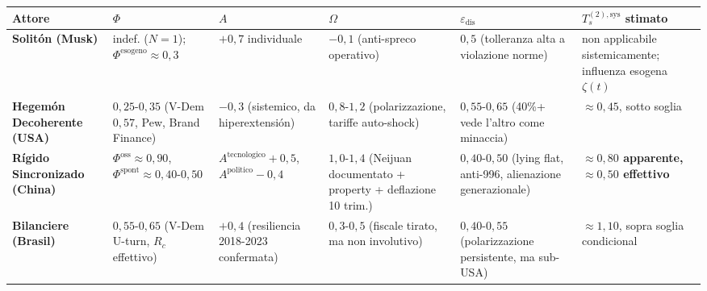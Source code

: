 {\def\LTcaptype{none} %
{\small\begin{longtable}[]{@{}
  >{\raggedright\arraybackslash}p{}
  >{\raggedright\arraybackslash}p{}
  >{\raggedright\arraybackslash}p{}
  >{\raggedright\arraybackslash}p{}
  >{\raggedright\arraybackslash}p{}
  >{\raggedright\arraybackslash}p{}@{}}
\toprule\noalign{}
\begin{minipage}[b]{\linewidth}\raggedright
Attore
\end{minipage} & \begin{minipage}[b]{\linewidth}\raggedright
\(\Phi\)
\end{minipage} & \begin{minipage}[b]{\linewidth}\raggedright
\(A\)
\end{minipage} & \begin{minipage}[b]{\linewidth}\raggedright
\(\Omega\)
\end{minipage} & \begin{minipage}[b]{\linewidth}\raggedright
\(\varepsilon_{\text{dis}}\)
\end{minipage} & \begin{minipage}[b]{\linewidth}\raggedright
\(T_s^{(2),\text{sys}}\) stimato
\end{minipage} \\
\midrule\noalign{}
\endhead
\bottomrule\noalign{}
\endlastfoot
\textbf{Solitón (Musk)} & indef. (\(N=1\));
\(\Phi^{\text{esogeno}} \approx 0{,}3\) & \(+0{,}7\) individuale &
\(-0{,}1\) (anti-spreco operativo) & \(0{,}5\) (tolleranza alta a
violazione norme) & non applicabile sistemicamente; influenza esogena
\(\zeta(t)\) \\
\textbf{Hegemón Decoherente (USA)} & \(0{,}25\)-\(0{,}35\) (V-Dem
\(0{,}57\), Pew, Brand Finance) & \(-0{,}3\) (sistemico, da
hiperextensión) & \(0{,}8\)-\(1{,}2\) (polarizzazione, tariffe
auto-shock) & \(0{,}55\)-\(0{,}65\) (40\%+ vede l'altro come minaccia) &
\textbf{\(\approx 0{,}45\)}, sotto soglia \\
\textbf{Rígido Sincronizado (China)} &
\(\Phi^{\text{oss}} \approx 0{,}90\),
\(\Phi^{\text{spont}} \approx 0{,}40\)-\(0{,}50\) &
\(A^{\text{tecnologico}} +0{,}5\), \(A^{\text{politico}} -0{,}4\) &
\(1{,}0\)-\(1{,}4\) (Neijuan documentato + property + deflazione 10
trim.) & \(0{,}40\)-\(0{,}50\) (lying flat, anti-996, alienazione
generazionale) & \textbf{\(\approx 0{,}80\) apparente,
\(\approx 0{,}50\) effettivo} \\
\textbf{Bilanciere (Brasil)} & \(0{,}55\)-\(0{,}65\) (V-Dem U-turn,
\(R_c\) effettivo) & \(+0{,}4\) (resiliencia 2018-2023 confermata) &
\(0{,}3\)-\(0{,}5\) (fiscale tirato, ma non involutivo) &
\(0{,}40\)-\(0{,}55\) (polarizzazione persistente, ma sub-USA) &
\textbf{\(\approx 1{,}10\)}, sopra soglia condicional \\
\end{longtable}}
}

